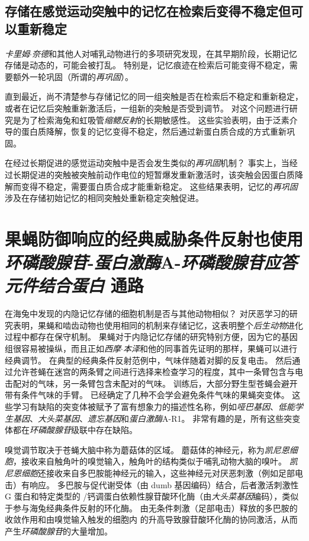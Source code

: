 \subsection{存储在感觉运动突触中的记忆在检索后变得不稳定但可以重新稳定}

\textit{卡里姆$\cdot$奈德}和其他人对哺乳动物进行的多项研究发现，在其早期阶段，长期记忆存储是动态的，可能会被打乱。
特别是，记忆痕迹在检索后可能变得不稳定，需要额外一轮巩固（所谓的\textit{再巩固}）。


直到最近，尚不清楚参与存储记忆的同一组突触是否在检索后不稳定和重新稳定，或者在记忆后突触重新激活后，一组新的突触是否受到调节。
对这个问题进行研究是为了检索海兔和虹吸管\textit{缩鳃反射}的长期敏感性。
这些实验表明，由于泛素介导的蛋白质降解，恢复的记忆变得不稳定，然后通过新蛋白质合成的方式重新巩固。


在经过长期促进的感觉运动突触中是否会发生类似的\textit{再巩固}机制？
事实上，当经过长期促进的突触被突触前动作电位的短暂爆发重新激活时，该突触会因蛋白质降解而变得不稳定，需要蛋白质合成才能重新稳定。
这些结果表明，记忆的\textit{再巩固}涉及在存储初始记忆的相同突触处重新稳定突触促进。



\section{果蝇防御响应的经典威胁条件反射也使用\textit{环磷酸腺苷}-\textit{蛋白激酶}A-\textit{环磷酸腺苷应答元件结合蛋白} 通路}

在海兔中发现的内隐记忆存储的细胞机制是否与其他动物相似？
对厌恶学习的研究表明，果蝇和啮齿动物也使用相同的机制来存储记忆，这表明整个\textit{后生动物}进化过程中都存在保守机制。
果蝇对于内隐记忆存储的研究特别方便，因为它的基因组很容易被操纵，而且正如\textit{西摩$\cdot$本泽}和他的同事首先证明的那样，果蝇可以进行经典调节。
在典型的经典条件反射范例中，气味伴随着对脚的反复电击。
然后通过允许苍蝇在迷宫的两条臂之间进行选择来检查学习的程度，其中一条臂包含与电击配对的气味，另一条臂包含未配对的气味。
训练后，大部分野生型苍蝇会避开带有条件气味的手臂。
已经确定了几种不会学会避免条件气味的果蝇突变体。
这些学习有缺陷的突变体被赋予了富有想象力的描述性名称，例如\textit{哑巴基因}、\textit{低能学生基因}、\textit{大头菜基因}、\textit{遗忘基因}和\textit{蛋白激酶}A-R1。
非常有趣的是，所有这些突变体都在\textit{环磷酸腺苷}级联中存在缺陷。


嗅觉调节取决于苍蝇大脑中称为蘑菇体的区域。
蘑菇体的神经元，称为\textit{凯尼恩细胞}，接收来自触角叶的嗅觉输入，触角叶的结构类似于哺乳动物大脑的嗅叶。
\textit{凯尼恩细胞}还接收来自多巴胺能神经元的输入，这些神经元对厌恶刺激（例如足部电击）有响应。
多巴胺与促代谢受体（由 dumb 基因编码）结合，后者激活刺激性 G 蛋白和特定类型的 /钙调蛋白依赖性腺苷酸环化酶（由\textit{大头菜基因}编码），类似于参与海兔经典条件反射的环化酶。
由无条件刺激（足部电击）释放的多巴胺的收敛作用和由嗅觉输入触发的细胞内  的升高导致腺苷酸环化酶的协同激活，从而产生\textit{环磷酸腺苷}的大量增加。


